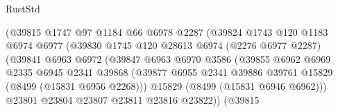\begin{lexlean}{RustStd}
\begin{coremodule}
                                      (@39815
                                        @1747
                                        @97
                                        @1184
                                        @66
                                        @6978
                                        @2287
                                        (@39824
                                          @1743
                                          @120
                                          @1183
                                          @6974
                                          @6977
                                          (@39830
                                            @1745
                                            @120
                                            @28613
                                            @6974
                                            (@2276 @6977 @2287)
                                            (@39841
                                              @6963
                                              @6972
                                              (@39847
                                                @6963
                                                @6970
                                                @3586
                                                (@39855
                                                  @6962
                                                  @6969
                                                  @2335
                                                  @6945
                                                  @2341
                                                  @39868
                                                  (@39877
                                                    @6955
                                                    @2341
                                                    @39886
                                                    @39761
                                                    @15829
                                                    (@8499 (@15831 @6956 @2268)))
                                                  @15829
                                                  (@8499 (@15831 @6946 @6962)))
                                                @23801
                                                @23804
                                                @23807
                                                @23811
                                                @23816
                                                @23822))
                                            (@39815

\end{coremodule}
\end{lexlean}
